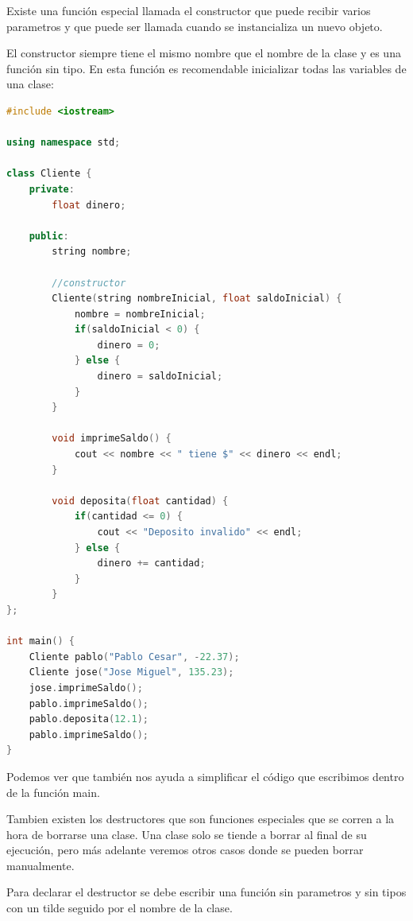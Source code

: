 \documentclass{article}
\begin{document}
Existe una función especial llamada el constructor que puede recibir varios parametros y que puede ser llamada cuando se instancializa un nuevo objeto.

El constructor siempre tiene el mismo nombre que el nombre de la clase y es una función sin tipo. En esta función es recomendable inicializar todas las variables de una clase:

\begin{lstlisting}[language=C++, caption=Constructores]
#include <iostream>

using namespace std;

class Cliente {
    private:
        float dinero;

    public:
        string nombre;

        //constructor
        Cliente(string nombreInicial, float saldoInicial) {
            nombre = nombreInicial;
            if(saldoInicial < 0) {
                dinero = 0;
            } else {
                dinero = saldoInicial;
            }
        }

        void imprimeSaldo() {
            cout << nombre << " tiene $" << dinero << endl;
        }

        void deposita(float cantidad) {
            if(cantidad <= 0) {
                cout << "Deposito invalido" << endl;
            } else {
                dinero += cantidad;
            }
        }
};

int main() {
    Cliente pablo("Pablo Cesar", -22.37);
    Cliente jose("Jose Miguel", 135.23);
    jose.imprimeSaldo();
    pablo.imprimeSaldo();
    pablo.deposita(12.1);
    pablo.imprimeSaldo();
}
\end{lstlisting}

Podemos ver que también nos ayuda a simplificar el código que escribimos dentro de la función main.

Tambien existen los destructores que son funciones especiales que se corren a la hora de borrarse una clase. Una clase solo se tiende a borrar al final de su ejecución, pero más adelante veremos otros casos donde se pueden borrar manualmente.

Para declarar el destructor se debe escribir una función sin parametros y sin tipos con un tilde seguido por el nombre de la clase.
\end{document}
